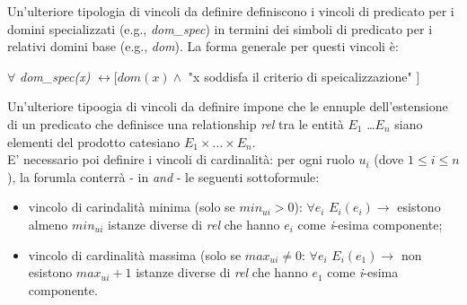 Un'ulteriore tipologia di vincoli da definire definiscono i vincoli di predicato per i domini specializzati (e.g., \textit{dom\_spec}) in termini dei simboli di predicato per i relativi domini base (e.g., \textit{dom}). La forma generale per questi vincoli è:
\begin{center}
	$\forall$ \textit{dom\_spec(x)} $\leftrightarrow [dom(x) \wedge $ "x soddisfa il criterio di speicalizzazione" $]$
\end{center}
Un'ulteriore tipoogia di vincoli da definire impone che le ennuple dell'estensione di un predicato che definisce una relationship \textit{rel} tra le entità $E_1$ \ldots $E_n$ siano elementi del prodotto catesiano $E_1 \times \ldots \times E_n$. \\
E' necessario poi definire i vincoli di cardinalità: per ogni ruolo $u_i$ (dove $1 \leq i \leq n$), la forumla conterrà - in \textit{and} - le seguenti sottoformule:
\begin{itemize}
	\item vincolo di carindalità minima (solo se $min_{ui} > 0$): $\forall e_i$ $E_i(e_i) \rightarrow $ esistono almeno $min_{ui}$ istanze diverse di \textit{rel} che hanno $e_i$ come \textit{i}-esima componente;
	\item vincolo di cardinalità massima (solo se $max_{ui} \neq 0$: $\forall e_i$ $E_i(e_1) \rightarrow $ non esistono $max_{ui}+1$ istanze diverse di \textit{rel} che hanno $e_1$ come \textit{i}-esima componente.
\end{itemize}